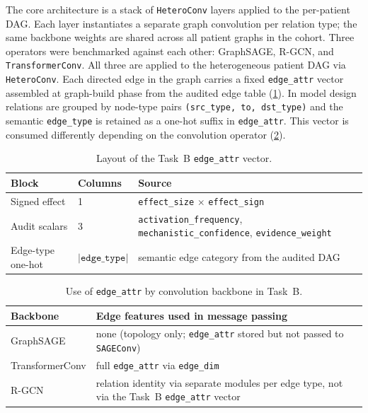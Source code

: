 The core architecture is a stack of \texttt{HeteroConv} layers applied to the
per-patient DAG. Each layer instantiates a separate graph convolution per
relation type; the same backbone weights are shared across all patient graphs
in the cohort. Three operators 
were benchmarked against each other: GraphSAGE, R-GCN, and
\texttt{TransformerConv}.
All three are applied to the heterogeneous patient DAG via \texttt{HeteroConv}.
Each directed edge in the graph carries a fixed \texttt{edge\_attr} vector 
assembled at
graph-build phase from the audited edge table (\cref{tab:edge_attr_layout}).
In model design relations are grouped by node-type pairs \texttt{(src\_type, to, dst\_type)}
and the semantic \texttt{edge\_type} is
retained as a one-hot suffix in \texttt{edge\_attr}. 
This vector is consumed differently depending on the convolution
operator (\cref{tab:edge_attr_by_conv}).

\begin{table}[t]
  \centering
  \small
  \caption{Layout of the Task~B \texttt{edge\_attr} vector.}
  \label{tab:edge_attr_layout}
  \begin{tabularx}{\textwidth}{@{}l l X@{}}
    \toprule
    \textbf{Block} & \textbf{Columns} & \textbf{Source} \\
    \midrule
    Signed effect &
    1 &
    \texttt{effect\_size} $\times$ \texttt{effect\_sign} \\
    Audit scalars &
    3 &
    \texttt{activation\_frequency}, \texttt{mechanistic\_confidence},
    \texttt{evidence\_weight} \\
    Edge-type one-hot &
    $|\texttt{edge\_type}|$ &
    semantic edge category from the audited DAG \\
    \bottomrule
  \end{tabularx}
\end{table}

\begin{table}[t]
  \centering
  \small
  \caption{Use of \texttt{edge\_attr} by convolution backbone in Task~B.}
  \label{tab:edge_attr_by_conv}
  \begin{tabularx}{\textwidth}{@{}l X@{}}
    \toprule
    \textbf{Backbone} & \textbf{Edge features used in message passing} \\
    \midrule
    GraphSAGE &
    none (topology only; \texttt{edge\_attr} stored but not passed to
    \texttt{SAGEConv}) \\
    TransformerConv &
    full \texttt{edge\_attr} via \texttt{edge\_dim} \\
    R-GCN &
    relation identity via separate modules per edge type, not via the
    Task~B \texttt{edge\_attr} vector \\
    \bottomrule
  \end{tabularx}
\end{table}

